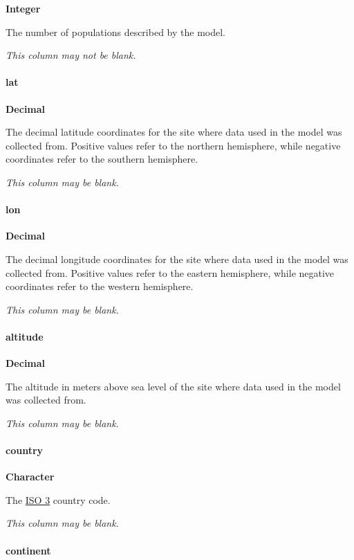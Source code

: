 \documentclass[]{article}
\let\oldparagraph\paragraph
\renewcommand{\paragraph}[1]{\oldparagraph{#1}\mbox{}}
\begin{document}
\textbf{Integer}

The number of populations described by the model.

\emph{This column may not be blank.}

\paragraph{lat}\label{lat}

\textbf{Decimal}

The decimal latitude coordinates for the site where data used in the
model was collected from. Positive values refer to the northern
hemisphere, while negative coordinates refer to the southern hemisphere.

\emph{This column may be blank.}

\paragraph{lon}\label{lon}

\textbf{Decimal}

The decimal longitude coordinates for the site where data used in the
model was collected from. Positive values refer to the eastern
hemisphere, while negative coordinates refer to the western hemisphere.

\emph{This column may be blank.}

\paragraph{altitude}\label{altitude}

\textbf{Decimal}

The altitude in meters above sea level of the site where data used in
the model was collected from.

\emph{This column may be blank.}

\paragraph{country}\label{country}

\textbf{Character}

The
\href{https://unstats.un.org/unsd/tradekb/knowledgebase/country-code}{ISO
3} country code.

\emph{This column may be blank.}

\paragraph{continent}\label{continent}
\end{document}
